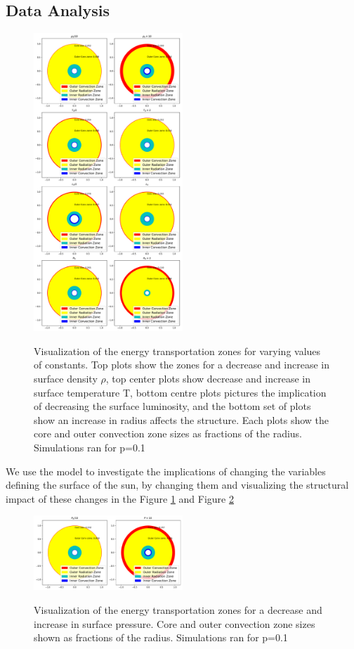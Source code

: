 \documentclass[10pt, nofootinbib, twocolumn]{revtex4-1}
\begin{document}
\subsection{Data Analysis}
\begin{figure}[H]
    \caption{Visualization of the energy transportation zones for varying values of constants. Top plots show the zones for a decrease and increase in surface density $\rho$, top center plots show decrease and increase in surface temperature T, bottom centre plots pictures the implication of decreasing the surface luminosity, and the bottom set of plots show an increase in radius affects the structure. Each plots show the core and outer convection zone sizes as fractions of the radius. Simulations ran for p=0.1}
    \centering
    \includegraphics[width = 0.5\textwidth]{Figures/simulation_part1.pdf} 
    \label{fig:test_1}
\end{figure} 
\newpage
We use the model to investigate the implications of changing the variables defining the surface of the sun, by changing them and visualizing the structural impact of these changes in the Figure \ref{fig:test_1} and Figure \ref{fig:test_2}

\begin{figure}[H]
    \caption{Visualization of the energy transportation zones for a decrease and increase in surface pressure. Core and outer convection zone sizes shown as fractions of the radius. Simulations ran for p=0.1}
    \centering
    \includegraphics[width = 0.5\textwidth]{Figures/simulation_part2.pdf} 
    \label{fig:test_2}
\end{figure} 
\end{document}
